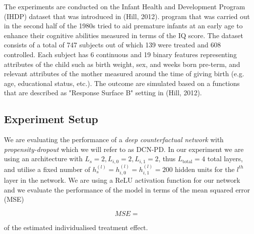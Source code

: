 The experiments are conducted on the Infant Health and Development Program (IHDP) dataset that was introduced in (Hill, 2012). %
 program that was carried out in the second half of the 1980s tried to aid premature infants at an early age to enhance their cognitive abilities measured in terms of the IQ score. The dataset consists of a total of 747 subjects out of which 139 were treated and 608 controlled. Each subject has 6 continuous and 19 binary features representing attributes of the child such as birth weight, sex, and weeks born pre-term, and relevant attributes of the mother measured around the time of giving birth (e.g. age, educational status, etc.). The outcome are simulated based on a functions that are described as "Response Surface B" setting in (Hill, 2012). %
 
 

\subsection{Experiment Setup}
We are evaluating the performance of a \emph{deep counterfactual network} with \emph{propensity-dropout} which we will refer to as DCN-PD. In our experiment we are using an architecture with $L_s = 2, L_{i,0} =2 , L_{i,1} = 2$, thus $L_{\text{total}} = 4$ total layers, %
and utilise a fixed number of $h_s^{(l)} = h_{i,0}^{(l)} = h_{i,1}^{(l)} = 200$ hidden units for the $l^{th}$ layer in the network. We are using a ReLU activation function for our network and we evaluate the performance of the model in terms of the mean squared error (MSE)

\begin{equation}
	MSE = 
\end{equation}

 of the estimated individualised treatment effect.



